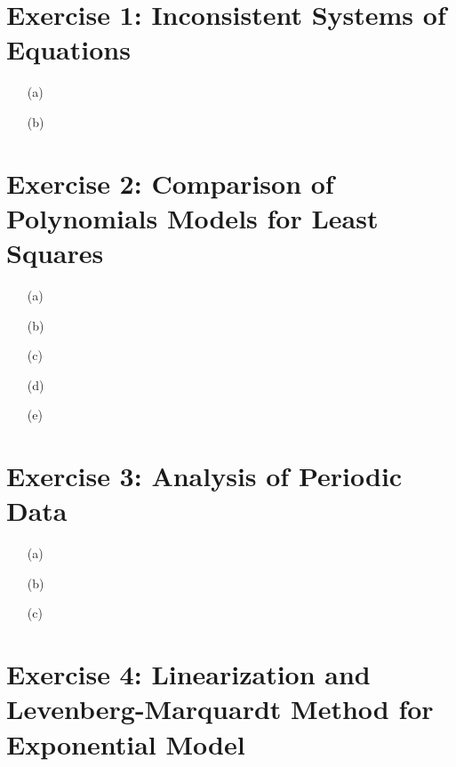 \documentclass[unicode,11pt,a4paper,oneside,numbers=endperiod,openany]{scrartcl}
\begin{document}
\setassignment
{}


\section*{Exercise 1: Inconsistent Systems of Equations}

\begin{itemize}
	\item [(a)]
	\item [(b)]
\end{itemize}


\section*{Exercise 2: Comparison of Polynomials Models for Least Squares}

\begin{itemize}
	\item [(a)] 
	\item [(b)] 
	\item [(c)] 
	\item [(d)] 
	\item [(e)]
\end{itemize}


\section*{Exercise 3: Analysis of Periodic Data}

\begin{itemize}
	\item [(a)] 
	\item [(b)] 
	\item [(c)]
\end{itemize}


\section*{Exercise 4: Linearization and Levenberg-Marquardt Method for Exponential Model}
\end{document}
